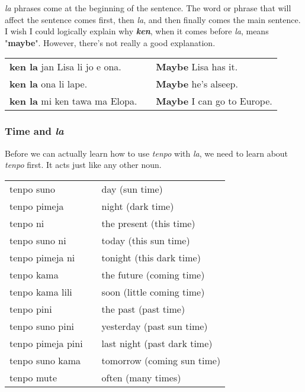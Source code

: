 \textit{la} phrases come at the beginning of the sentence. 
The word or phrase that will affect the sentence comes first, then \textit{la}, and then finally comes the main sentence. 
I wish I could logically explain why \textbf{\textit{ken}}, when it comes before \textit{la}, means "\textbf{maybe}". 
However, there's not really a good explanation. 

\begin{supertabular}{p{5,5cm}|ll}
\textbf{ken la} jan Lisa li jo e ona. && \textbf{Maybe} Lisa has it. \\
\textbf{ken la} ona li lape. && \textbf{Maybe} he's alseep. \\
\textbf{ken la} mi ken tawa ma Elopa. && \textbf{Maybe} I can go to Europe. \\
\end{supertabular} 
%
\subsubsection*{Time and \textit{la}}
%
Before we can actually learn how to use \textit{tenpo} with \textit{la}, we need to learn about \textit{tenpo} first. 
It acts just like any other noun. 

\begin{supertabular}{p{5,5cm}|ll}
tenpo suno && day (sun time) \\
tenpo pimeja && night (dark time) \\
tenpo ni && the present (this time) \\
tenpo suno ni && today (this sun time) \\
tenpo pimeja ni && tonight (this dark time) \\
tenpo kama && the future (coming time) \\
tenpo kama lili && soon (little coming time) \\
tenpo pini && the past (past time) \\
tenpo suno pini && yesterday (past sun time) \\
tenpo pimeja pini && last night (past dark time) \\
tenpo suno kama && tomorrow (coming sun time) \\
tenpo mute && often (many times) \\
\end{supertabular} 

